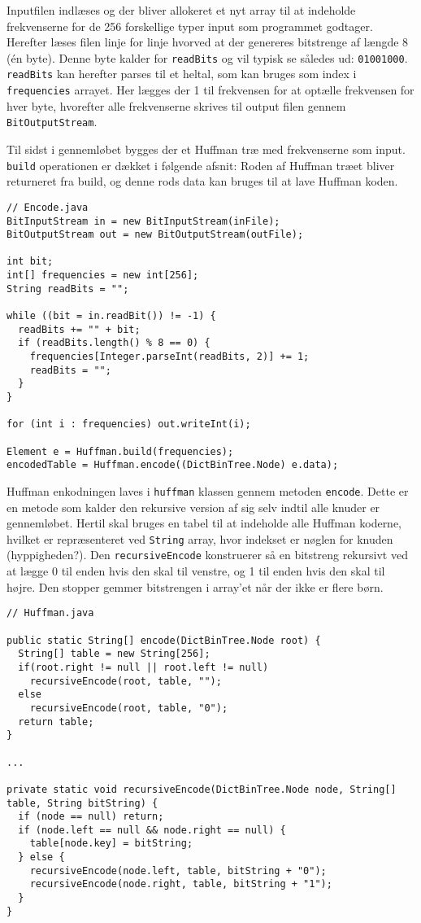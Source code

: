 \documentclass{article}
\begin{document}
Inputfilen indlæses og der bliver allokeret et nyt array til at indeholde frekvenserne for de 256 forskellige typer input som programmet godtager. Herefter læses filen linje for linje hvorved at der genereres bitstrenge af længde 8 (én byte). Denne byte kalder for \texttt{readBits} og vil typisk se således ud: \texttt{01001000}. \texttt{readBits} kan herefter parses til et heltal, som kan bruges som index i \texttt{frequencies} arrayet. Her lægges der 1 til frekvensen for at optælle frekvensen for hver byte, hvorefter alle frekvenserne skrives til output filen gennem \texttt{BitOutputStream}.

Til sidst i gennemløbet bygges der et Huffman træ med frekvenserne som input. \texttt{build} operationen er dækket i følgende afsnit: %
Roden af Huffman træet bliver returneret fra build, og denne rods data kan bruges til at lave Huffman koden.

\begin{lstlisting}
// Encode.java
BitInputStream in = new BitInputStream(inFile);
BitOutputStream out = new BitOutputStream(outFile);

int bit;
int[] frequencies = new int[256];
String readBits = "";

while ((bit = in.readBit()) != -1) {
  readBits += "" + bit;
  if (readBits.length() % 8 == 0) {
    frequencies[Integer.parseInt(readBits, 2)] += 1;
    readBits = "";
  }
}

for (int i : frequencies) out.writeInt(i);

Element e = Huffman.build(frequencies);
encodedTable = Huffman.encode((DictBinTree.Node) e.data);
\end{lstlisting}

\newpage
Huffman enkodningen laves i \texttt{huffman} klassen gennem metoden \texttt{encode}. Dette er en metode som kalder den rekursive version af sig selv indtil alle knuder er gennemløbet. Hertil skal bruges en tabel til at indeholde alle Huffman koderne, hvilket er repræsenteret ved \texttt{String} array, hvor indekset er nøglen for knuden (hyppigheden?). Den \texttt{recursiveEncode} konstruerer så en bitstreng rekursivt ved at lægge 0 til enden hvis den skal til venstre, og 1 til enden hvis den skal til højre. Den stopper gemmer bitstrengen i array'et når der ikke er flere børn.

\begin{lstlisting}
// Huffman.java

public static String[] encode(DictBinTree.Node root) {
  String[] table = new String[256];
  if(root.right != null || root.left != null)
    recursiveEncode(root, table, "");
  else
    recursiveEncode(root, table, "0");
  return table;
}

...

private static void recursiveEncode(DictBinTree.Node node, String[] table, String bitString) {
  if (node == null) return;
  if (node.left == null && node.right == null) {
    table[node.key] = bitString;
  } else {
    recursiveEncode(node.left, table, bitString + "0");
    recursiveEncode(node.right, table, bitString + "1");
  }
}
\end{lstlisting}
\end{document}

